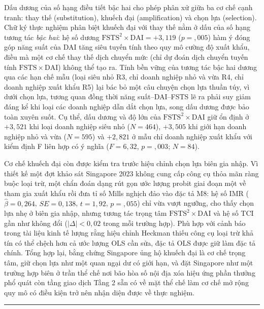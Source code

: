 \documentclass[
  a4paper,
  13pt]{extreport}
\begin{document}
Dấu dương của số hạng điều tiết bậc hai cho phép phân xử giữa ba cơ chế
cạnh tranh: thay thế (substitution), khuếch đại (amplification) và chọn
lựa (selection). Chữ ký thực nghiệm phân biệt khuếch đại với thay thế
nằm ở dấu của số hạng tương tác \emph{bậc hai}: hệ số dương
\(\mathrm{FSTS}^2 \times \mathrm{DAI} = +3{,}119\) (\(p = {,}005\)) hàm
ý đóng góp năng suất của DAI tăng siêu tuyến tính theo quy mô cường độ
xuất khẩu, điều mà một cơ chế thay thế dịch chuyển mức (chỉ dự đoán dịch
chuyển tuyến tính \(\mathrm{FSTS} \times \mathrm{DAI}\)) không thể tạo
ra. Tính bền vững của tương tác bậc hai dương qua các hạn chế mẫu (loại
siêu nhỏ R3, chỉ doanh nghiệp nhỏ và vừa R4, chỉ doanh nghiệp xuất khẩu
R5) lại bác bỏ một câu chuyện chọn lựa thuần túy, vì dưới chọn lựa,
tương quan đồng thời năng suất--DAI--FSTS lẽ ra phải suy giảm đáng kể
khi loại các doanh nghiệp dẫn dắt chọn lựa, song dấu dương được bảo toàn
xuyên suốt. Cụ thể, dấu dương và độ lớn của
\(\mathrm{FSTS}^2 \times \mathrm{DAI}\) giữ ổn định ở \(+3{,}521\) khi
loại doanh nghiệp siêu nhỏ (\(N = 464\)), \(+3{,}505\) khi giới hạn
doanh nghiệp nhỏ và vừa (\(N = 595\)) và \(+2{,}821\) ở mẫu chỉ doanh
nghiệp xuất khẩu với kiểm định F liên hợp có ý nghĩa (\(F = 6{,}32\),
\(p = {,}003\); \(N = 84\)).

Cơ chế khuếch đại còn được kiểm tra trước hiệu chỉnh chọn lựa biên gia
nhập. Vì thiết kế một đợt khảo sát Singapore 2023 không cung cấp công cụ
thỏa mãn ràng buộc loại trừ, một chẩn đoán dạng rút gọn ước lượng probit
giai đoạn một về tham gia xuất khẩu rồi đưa tỉ số Mills nghịch đảo vào
đặc tả M8: hệ số IMR (\(\hat{\beta} = 0{,}264\), \(SE = 0{,}138\),
\(t = 1{,}92\), \(p = {,}055\)) chỉ vừa vượt ngưỡng, cho thấy chọn lựa
nhẹ ở biên gia nhập, nhưng tương tác trọng tâm
\(\mathrm{FSTS}^2 \times \mathrm{DAI}\) và hệ số TCI gần như không đổi
(\(|\Delta| < 0{,}02\) trong mỗi trường hợp). Phù hợp với cảnh báo trong
tài liệu kinh tế lượng rằng hiệu chỉnh Heckman thiếu công cụ loại trừ
khả tín có thể chệch hơn cả ước lượng OLS cần sửa, đặc tả OLS được giữ
làm đặc tả chính. Tổng hợp lại, bằng chứng Singapore ủng hộ khuếch đại
là cơ chế trọng tâm, giữ chọn lựa như một quan ngại dư có giới hạn, và
đặt Singapore như một trường hợp biên ở trần thể chế nơi bão hòa số nội
địa xóa hiệu ứng phần thưởng phổ quát còn tầng giao dịch Tầng 2 sẵn có
về mặt thể chế làm cơ chế mở rộng quy mô có điều kiện trở nên nhận diện
được về thực nghiệm.

\begin{center}\rule{0.5\linewidth}{0.5pt}\end{center}
\end{document}
